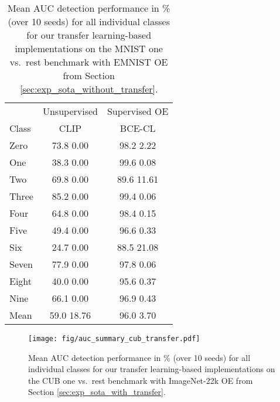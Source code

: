 \documentclass[10pt]{article} \usepackage[accepted]{stylefiles/tmlr}
\begin{document}
\begin{table*}[th]
    \caption{Mean AUC detection performance in \% (over 10 seeds) for all individual classes for our transfer learning-based implementations on the MNIST one vs.~rest benchmark with EMNIST OE from Section \ref{sec:exp_sota_without_transfer}. }
    \label{tab:mnist_one_vs_rest_transfer}
    \vspace{0.5em}
    \centering\small
    
\begin{tabular}{lcc}
\toprule
& \multicolumn{1}{c|}{Unsupervised} &   \multicolumn{1}{c}{Supervised OE} \\
Class &   \multicolumn{1}{c|}{CLIP} &     \multicolumn{1}{c}{BCE-CL} \\
\midrule
Zero & \multicolumn{1}{c|}{73.8  0.00} & \multicolumn{1}{c}{98.2  2.22} \\
One & \multicolumn{1}{c|}{38.3  0.00} & \multicolumn{1}{c}{99.6  0.08} \\
Two & \multicolumn{1}{c|}{69.8  0.00} & \multicolumn{1}{c}{89.6  11.61} \\
Three & \multicolumn{1}{c|}{85.2  0.00} & \multicolumn{1}{c}{99.4  0.06} \\
Four & \multicolumn{1}{c|}{64.8  0.00} & \multicolumn{1}{c}{98.4  0.15} \\
Five & \multicolumn{1}{c|}{49.4  0.00} & \multicolumn{1}{c}{96.6  0.33} \\
Six & \multicolumn{1}{c|}{24.7  0.00} & \multicolumn{1}{c}{88.5  21.08} \\
Seven & \multicolumn{1}{c|}{77.9  0.00} & \multicolumn{1}{c}{97.8  0.06} \\
Eight & \multicolumn{1}{c|}{40.0  0.00} & \multicolumn{1}{c}{95.6  0.37} \\
Nine & \multicolumn{1}{c|}{66.1  0.00} & \multicolumn{1}{c}{96.9  0.43} \\
\midrule
Mean & \multicolumn{1}{c|}{59.0  18.76} & \multicolumn{1}{c}{96.0  3.70} \\
\bottomrule
\end{tabular}
     \end{table*}
\begin{figure}[hbt] 
  \begin{center} 
      \texttt{[image: fig/auc\_summary\_cub\_transfer.pdf]}
      \caption{Mean AUC detection performance in \% (over 10 seeds) for all individual classes for our transfer learning-based implementations on the CUB one vs.~rest benchmark with ImageNet-22k OE from Section \ref{sec:exp_sota_with_transfer}.}
      \label{fig:auc_summary_cub_transfer}
\end{center}
\end{figure}
\end{document}
